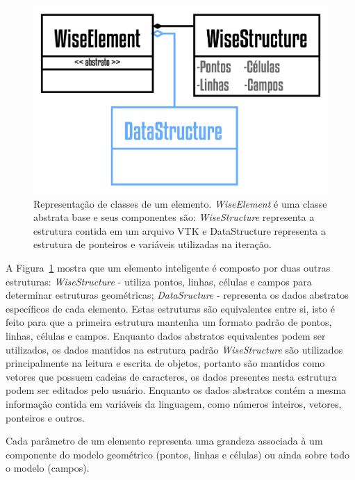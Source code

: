 \begin{figure}[!htbp]
	\centering
	\includegraphics[scale=2]{Figures/WiseElement@16x.png}
	\caption{Representação de classes de um elemento. \textit{WiseElement} é uma classe abstrata base e seus componentes são: \textit{WiseStructure} representa a estrutura contida em um arquivo VTK e DataStructure representa a estrutura de ponteiros e variáveis utilizadas na iteração.}
	\label{fig2:wiselement}
\end{figure}

A Figura~\ref{fig2:wiselement} mostra que um elemento inteligente é composto por duas outras estruturas:  \textit{WiseStructure} - utiliza pontos, linhas, células e campos para determinar estruturas geométricas;  \textit{DataSructure} - representa os dados abstratos específicos de cada elemento. Estas estruturas são equivalentes entre si, isto é feito para que a primeira estrutura mantenha um formato padrão de pontos, linhas, células e campos. Enquanto dados abstratos equivalentes podem ser utilizados, os dados mantidos na estrutura padrão \textit{WiseStructure} são utilizados principalmente na leitura e escrita de objetos, portanto são mantidos como vetores que possuem cadeias de caracteres, os dados presentes nesta estrutura podem ser editados pelo usuário. Enquanto os dados abstratos contém a mesma informação contida em variáveis da linguagem, como números inteiros, vetores, ponteiros e outros.

Cada parâmetro de um elemento representa uma grandeza associada à um componente do modelo geométrico (pontos,  linhas e células) ou ainda sobre todo o modelo (campos). 


